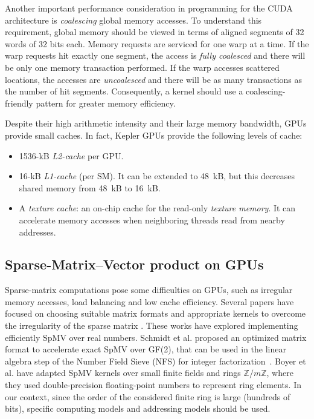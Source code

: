 \documentclass[runningheads,orivec]{llncs}
\begin{document}
Another important performance consideration in programming for the CUDA architecture is \textit{coalescing} global memory accesses. To understand this requirement, global memory should be viewed in terms of aligned segments of 32 words of 32 bits each. Memory requests are serviced for one warp at a time. If the warp requests hit exactly one segment, the access is \textit{fully coalesced} and there will be only one memory transaction performed. If the warp accesses scattered locations, the accesses are \textit{uncoalesced} and there will be as many transactions as the number of hit segments. Consequently, a kernel should use a coalescing-friendly pattern for greater memory efficiency.      
 
Despite their high arithmetic intensity and their large memory bandwidth, GPUs provide small caches. In fact, Kepler GPUs provide the following levels of cache:
\begin{itemize}
\vspace*{-0.25cm}

\item 1536-kB \textit{L2-cache} per GPU.
\item 16-kB \textit{L1-cache} (per SM). It can be extended to 48~kB, but this decreases shared memory from 48~kB to 16~kB.
\item A \textit{texture cache}: an on-chip cache for the read-only \textit{texture memory}. It can accelerate memory accesses when neighboring threads read from nearby addresses.
\end{itemize}  

\vspace*{-0.5cm}

\subsection{Sparse-Matrix--Vector product on GPUs}
\vspace*{-0.25cm}

Sparse-matrix computations pose some difficulties on GPUs, such as irregular memory accesses, load balancing and low cache efficiency. Several papers have focused on choosing suitable matrix formats and appropriate kernels to overcome the irregularity of the sparse matrix \cite{BELL08,VAZQ09}. These works have explored implementing efficiently SpMV over real numbers. Schmidt et al. \cite{SHMI11} proposed an optimized matrix format to accelerate exact SpMV over GF(2), that can be used in the linear algebra step of the Number Field Sieve (NFS) for integer factorization~\cite{STAC08}. Boyer et al. \cite{BOYE10} have adapted SpMV kernels over small finite fields and rings $\mathbb{Z}/m\mathbb{Z}$, where they used double-precision floating-point numbers to represent ring elements. In our context, since the order of the considered finite ring is large (hundreds of bits), specific computing models and addressing models should be used.   
\end{document}

